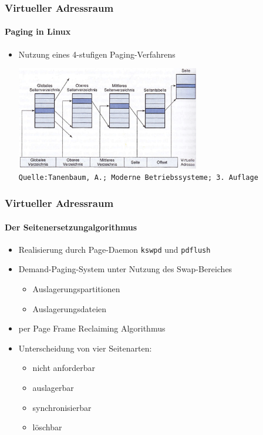 \documentclass[ddcfooter,nosectionnum]{tudbeamer}
\begin{document}
\begin{frame}
    \frametitle{Virtueller Adressraum}
    \framesubtitle {Paging in Linux}
    \begin{itemize}
         \item Nutzung eines 4-stufigen Paging-Verfahrens        
   
    \includegraphics[width=8cm]{vierstufiges.png}\\
    \texttt{\tiny Quelle:Tanenbaum, A.; Moderne Betriebssysteme; 3. Auflage}\\
     \end{itemize}
\end{frame}


\begin{frame}
 
    \frametitle {Virtueller Adressraum}
    
    \framesubtitle {Der Seitenersetzungalgorithmus}
    \begin{itemize}
       
	 \item Realisierung durch Page-Daemon \texttt{kswpd} und \texttt{pdflush}
	 \item Demand-Paging-System unter Nutzung des Swap-Bereiches
	 \begin{itemize}
	 	\item Auslagerungspartitionen 
		\item Auslagerungsdateien
	\end{itemize}
		
		\item per Page Frame Reclaiming Algorithmus
		\item Unterscheidung von vier Seitenarten:
		\begin{itemize}
			\item nicht anforderbar
			\item auslagerbar
			\item synchronisierbar
			\item löschbar
		\end{itemize}	
	\end{itemize}	
		  
    
\end{frame}
\end{document}
